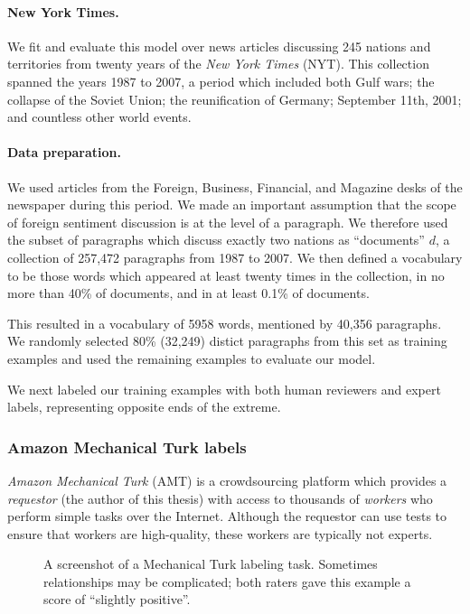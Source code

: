 \paragraph{New York Times.}
We fit and evaluate this model over news articles discussing 245
nations and territories from twenty years of the \emph{New York Times}
(NYT).  This collection spanned the years 1987 to 2007, a period which
included both Gulf wars; the collapse of the Soviet Union; the
reunification of Germany; September 11th, 2001; and countless other
world events.

\paragraph{Data preparation.}
We used articles from the Foreign, Business, Financial, and Magazine
desks of the newspaper during this period. We made an important
assumption that the scope of foreign sentiment discussion is at the
level of a paragraph.  We therefore used the subset of paragraphs
which discuss exactly two nations as ``documents'' $d$, a collection
of 257,472 paragraphs from 1987 to 2007.  We then defined a vocabulary
to be those words which appeared at least twenty times in the
collection, in no more than 40\% of documents, and in at least 0.1\%
of documents.

This resulted in a vocabulary of 5958 words, mentioned by 40,356
paragraphs. We randomly selected 80\% (32,249) distict paragraphs from
this set as training examples and used the remaining examples to
evaluate our model.

We next labeled our training examples with both human reviewers and
expert labels, representing opposite ends of the extreme.

\subsubsection{Amazon Mechanical Turk labels}
\label{section:mturk}

\emph{Amazon Mechanical Turk} (AMT) is a crowdsourcing platform which
provides a \emph{requestor} (the author of this thesis) with access to
thousands of \emph{workers} who perform simple tasks over the
Internet.  Although the requestor can use tests to ensure that workers
are high-quality, these workers are typically not experts.

\begin{figure}
  \setlength\fboxsep{0pt}
  \setlength\fboxrule{0.5pt}
  \center {}
  \label{figure:mechanical_turk_sample}
  \small\caption{A screenshot of a Mechanical Turk labeling task.
    Sometimes relationships may be complicated; both raters gave this
    example a score of ``slightly positive''.}
  \normalsize
\end{figure}

